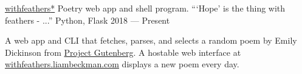 \showoff
{\textcolor{my-blue}{\href{https://withfeathers.liambeckman.com}{withfeathers\textcolor{my-red}{*}}}}
{Poetry web app and shell program. ```Hope' is the thing with feathers - ...''}
{Python, Flask}
{2018 --- Present}

A web app and CLI that fetches, parses, and selects a random poem by Emily Dickinson from \textcolor{my-blue}{\href{https://www.gutenberg.org/ebooks/12242}{Project Gutenberg}}. A hostable web interface at \textcolor{my-blue}{\href{https://withfeathers.liambeckman.com}{withfeathers.liambeckman.com}} displays a new poem every day.

